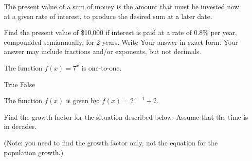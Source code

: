 \documentclass[11pt,answers]{exam}
\begin{document}
\begin{questions}


\addpoints



\question[2] The present value of a sum of money is the amount that must be invested now, at a given rate of interest, to produce the desired sum at a later date. 

Find the present value of \$10,000 if interest is paid at a rate of 0.8\% per year, compounded semiannually, for 2 years. Write Your answer in exact form: Your answer may include fractions and/or exponents, but not decimals.

\fillwithdottedlines{2cm}
\bonusquestion[1]  The function $\displaystyle f(x)=7^x$ is one-to-one.
\begin{oneparchoices}
	\choice True
	\choice False
\end{oneparchoices}

\question The function $f(x)$ is given by: $\displaystyle f(x) = 2^{x-1}+2$. 

\question[1]  Find the growth factor for the situation described below. Assume that the time is in decades.

{}

(Note: you need to find the growth factor only, not the equation for the population growth.)

		\fillwithdottedlines{2cm}
\end{questions}
\end{document}
